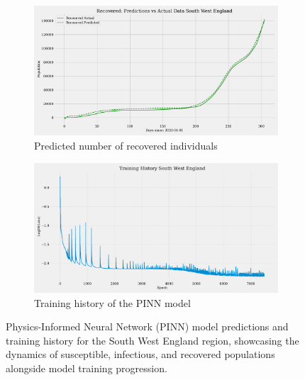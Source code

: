 \documentclass[12pt]{article}
\begin{document}
\begin{figure}[h]
    \begin{subfigure}[t]{0.45\textwidth}
        \includegraphics[width=\textwidth]{images/pinn/R_predictions_South West England.pdf}
        \caption{Predicted number of recovered individuals}
        \label{fig:R_predictions_South West England}
    \end{subfigure}
    \hfill %
    \begin{subfigure}[t]{0.45\textwidth}
        \centering
        \includegraphics[width=\textwidth]{images/pinn/Training_History_South West England.pdf}
        \caption{Training history of the PINN model}
        \label{fig:Training_History_South West England}
    \end{subfigure}
    \caption{Physics-Informed Neural Network (PINN) model predictions and training history for the South West England region, showcasing the dynamics of susceptible, infectious, and recovered populations alongside model training progression.}
    \label{fig:PINN_South West England_Comprehensive}

\end{figure}
\end{document}
